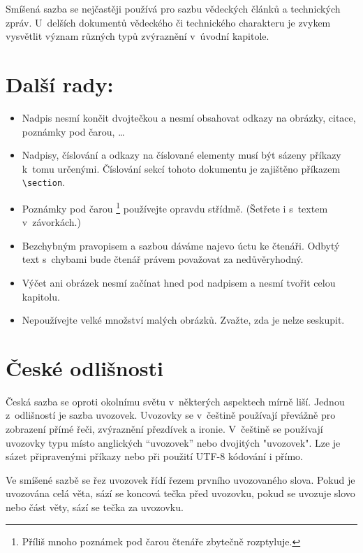 \documentclass[a4paper, 10pt, twocolumn]{article}
\begin{document}
    Smíšená sazba se nejčastěji používá pro sazbu vědeckých článků a technických zpráv.
    U~delších dokumentů vědeckého či technického charakteru je zvykem vysvětlit
    význam různých typů zvýraznění v~úvodní kapitole.

    \section{Další rady:}
    \begin{itemize}
        \item Nadpis nesmí končit dvojtečkou a nesmí obsahovat odkazy na obrázky,
        citace, poznámky pod čarou, \dots
        \item Nadpisy, číslování a odkazy na číslované elementy musí být sázeny
        příkazy k~tomu určenými. Číslování sekcí tohoto dokumentu je zajištěno příkazem
        \verb!\section!.
        \item Poznámky pod čarou%
        \footnote[1]{Příliš mnoho poznámek pod čarou čtenáře zbytečně rozptyluje.}
        používejte opravdu střídmě. (Šetřete i s~textem v~závorkách.)
        \item Bezchybným pravopisem a sazbou dáváme najevo úctu ke čtenáři.
        Odbytý text s~chybami bude čtenář právem považovat za nedůvěryhodný.
        \item Výčet ani obrázek nesmí začínat hned pod nadpisem a nesmí tvořit celou kapitolu.
        \item Nepoužívejte velké množství malých obrázků. Zvažte, zda je nelze seskupit.
    \end{itemize}

    \section{České odlišnosti}
    Česká sazba se oproti okolnímu světu v~některých aspektech mírně liší. Jednou
    z~odlišností je sazba uvozovek. Uvozovky se v~češtině používají převážně pro zobrazení přímé
    řeči, zvýraznění přezdívek a ironie. V~češtině se používají uvozovky typu 
    místo anglických ``uvozovek'' nebo dvojitých "uvozovek". Lze je sázet připravenými příkazy
    nebo při použití UTF-8 kódování i přímo.

    Ve smíšené sazbě se řez uvozovek řídí řezem prvního uvozovaného slova.
    Pokud je uvozována celá věta, sází se koncová tečka před uvozovku,
    pokud se uvozuje slovo nebo část věty, sází se tečka za uvozovku.
\end{document}
